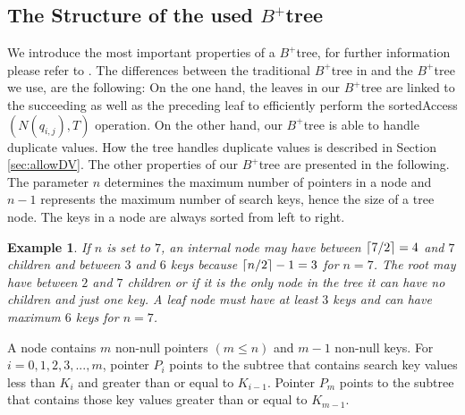 \documentclass[abstracton,12pt,oneside]{scrreprt}
\DeclarePairedDelimiter\ceil{\lceil}{\rceil}
\newtheorem{example}{Example}
\begin{document}
\subsection{The Structure of the used $B^+$tree}
\label{structureBtree}
We introduce the most important properties of a $B^+$tree, for further information please refer to \cite{DatabaseSystemC}. The differences between the traditional $B^+$tree in \cite{DatabaseSystemC} and the $B^+$tree we use, are the following: On the one hand, the leaves in our $B^+$tree are linked to the succeeding as well as the preceding leaf to efficiently perform the sortedAccess$(N(q_{i,j}),T)$ operation. On the other hand, our $B^+$tree is able to handle duplicate values. How the tree handles duplicate values is described in Section \ref{sec:allowDV}. The other properties of our $B^+$tree are presented in the following.\\
The parameter $n$ determines the maximum number of pointers in a node and $n-1$ represents the maximum number of search keys, hence the size of a tree node. The keys in a node are always sorted from left to right. 
\begin{example}
	If $n$ is set to $7$, an internal node may have between $\ceil{7/2} = 4$ and $7$ children and between $3$ and $6$ keys because $\ceil{n/2}-1 = 3$ for $n=7$. The root may have between $2$ and $7$ children or if it is the only node in the tree it can have no children and just one key. A leaf node must have at least $3$ keys and can have maximum $6$ keys for $n=7$.
\end{example}
A node contains $m$ non-null pointers $\left(m \leq n\right)$ and $m-1$ non-null keys. For $i = 0, 1, 2, 3, . . . , m$, pointer $P_i$ points to the subtree that contains search key values less than $K_i$ and greater than or equal to $K_{i-1}$. Pointer $P_m$ points to the subtree that contains those key values greater than or equal to $K_{m-1}$. 
\end{document}
